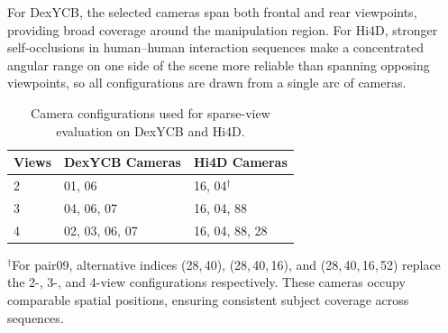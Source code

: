 For DexYCB, the selected cameras span both frontal and rear viewpoints, providing broad coverage around the manipulation region. For Hi4D, stronger self-occlusions in human--human interaction sequences make
a concentrated angular range on one side of the scene more reliable than
spanning opposing viewpoints, so all configurations are drawn from a single
arc of cameras.

\begin{table}[!htb]
\centering
\caption{Camera configurations used for sparse-view evaluation on DexYCB and Hi4D.}
\label{tab:camera_configs}
\begin{tabular}{lll}
\toprule
Views & DexYCB Cameras & Hi4D Cameras \\
\midrule
2 & 01, 06               & 16, 04$^{\dagger}$ \\
3 & 04, 06, 07           & 16, 04, 88 \\
4 & 02, 03, 06, 07       & 16, 04, 88, 28 \\
\bottomrule
\end{tabular}

\vspace{0.5em}
\begin{minipage}{0.95\linewidth}
\footnotesize
$^{\dagger}$For pair09, alternative indices (28,\,40), (28,\,40,\,16), and
(28,\,40,\,16,\,52) replace the 2-, 3-, and 4-view configurations respectively.
These cameras occupy comparable spatial positions, ensuring consistent subject
coverage across sequences.
\end{minipage}
\end{table}

\FloatBarrier

